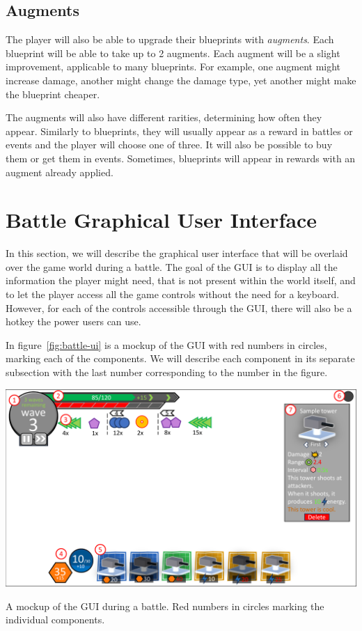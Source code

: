 \subsection{Augments}
\begin{notindemo}
    The player will also be able to upgrade their blueprints with \emph{augments}.
    Each blueprint will be able to take up to 2 augments.
    Each augment will be a slight improvement, applicable to many blueprints.
    For example, one augment might increase damage, another might change the damage type, yet another might make the blueprint cheaper.

    The augments will also have different rarities, determining how often they appear.
    Similarly to blueprints, they will usually appear as a reward in battles or events and the player will choose one of three.
    It will also be possible to buy them or get them in events.
    Sometimes, blueprints will appear in rewards with an augment already applied.
\end{notindemo}

\section{Battle Graphical User Interface}

In this section, we will describe the graphical user interface that will be overlaid over the game world during a battle.
The goal of the GUI is to display all the information the player might need, that is not present within the world itself, and to let the player access all the game controls without the need for a keyboard.
However, for each of the controls accessible through the GUI, there will also be a hotkey the power users can use.

In figure~\ref{fig:battle-ui} is a mockup of the GUI with red numbers in circles, marking each of the components.
We will describe each component in its separate subsection with the last number corresponding to the number in the figure.

\begin{center}
    \captionsetup{type=figure}
    \includegraphics[width=\textwidth]{img/Battle UI design.pdf}
    \caption{A mockup of the GUI during a battle. Red numbers in circles marking the individual components.}
    \label{fig:battle-ui}
\end{center}

